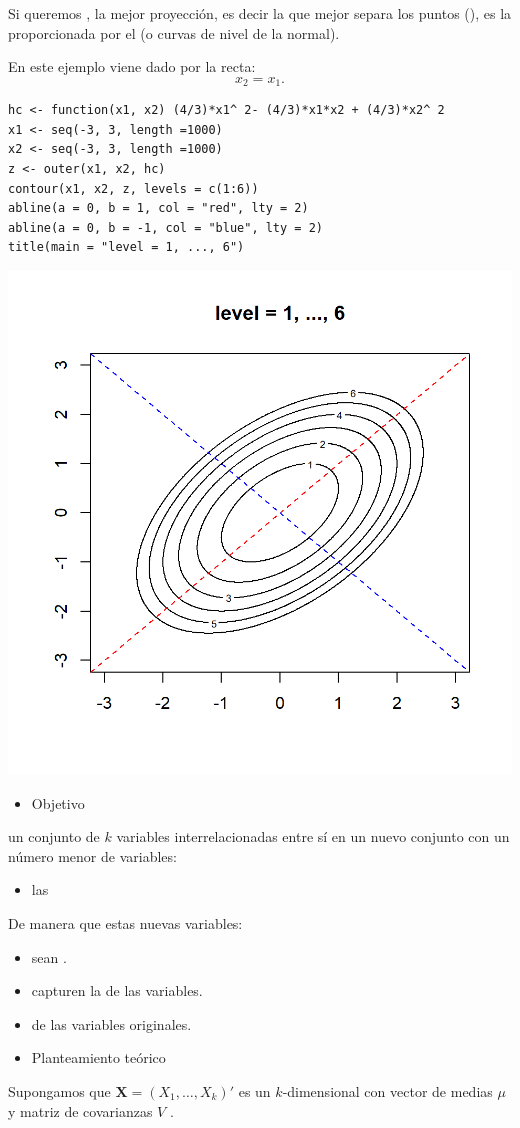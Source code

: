 \begin{minipage}{0.45\textwidth}
	Si queremos , la mejor proyección, es decir la que mejor separa los puntos (), es la proporcionada por el  (o curvas de nivel de la normal).
	
	En este ejemplo viene dado por la recta: \[ x_2=x_1. \]
\end{minipage}\qquad\begin{minipage}{0.5\textwidth}
\begin{lstlisting}
hc <- function(x1, x2) (4/3)*x1^ 2- (4/3)*x1*x2 + (4/3)*x2^ 2
x1 <- seq(-3, 3, length =1000)
x2 <- seq(-3, 3, length =1000)
z <- outer(x1, x2, hc)
contour(x1, x2, z, levels = c(1:6))
abline(a = 0, b = 1, col = "red", lty = 2)
abline(a = 0, b = -1, col = "blue", lty = 2)
title(main = "level = 1, ..., 6")
\end{lstlisting}
\end{minipage}
\begin{flushright}
\includegraphics[width=0.5\linewidth]{"Temas/Imágenes/Tema 4/screenshot003"}
\end{flushright}
\begin{itemize}[label=\color{red}\textbullet, leftmargin=*]
	\item \color{lightblue}Objetivo
\end{itemize}
 un conjunto de $k$ variables interrelacionadas entre sí en un nuevo conjunto con un número menor de variables:
\begin{itemize}
	\item las 
\end{itemize}
De manera que estas nuevas variables:
\begin{itemize}
	\item sean .
	\item capturen la  de las variables.
	\item {} de las variables originales.
\end{itemize}
\begin{itemize}[label=\color{red}\textbullet, leftmargin=*]
	\item \color{lightblue}Planteamiento teórico
\end{itemize}
Supongamos que $\mathbf{X}=(X_1,\dots,X_k)'$ es un \vea $k$-dimensional con vector de medias $\mu$ y matriz de covarianzas $V$ .

